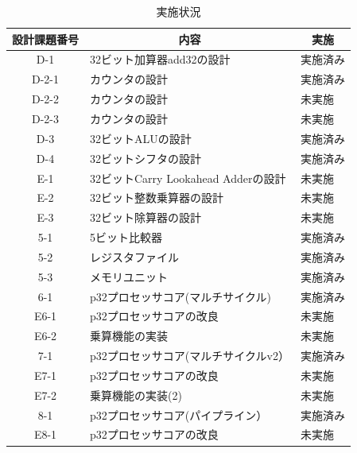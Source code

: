 \documentclass{jarticle}[11pt]
\begin{document}
\begin{table}[htb] %
\caption{実施状況}
\label{実施状況}
\begin{center}
\begin{tabular}{c|p{6cm}|p{4cm}}
\hline \hline
設計課題番号 & 
\multicolumn{1}{c}{内容} &
\multicolumn{1}{|c}{実施} 
\\ \hline

D-1 &
32ビット加算器add32の設計 &
実施済み 
\\

D-2-1 &
カウンタの設計 &
実施済み 
\\

D-2-2 &
カウンタの設計 &
未実施
\\

D-2-3 &
カウンタの設計 &
未実施
\\

D-3 &
32ビットALUの設計 &
実施済み
\\

D-4 &
32ビットシフタの設計 &
実施済み
\\

E-1 &
32ビットCarry Lookahead Adderの設計 &
未実施
\\

E-2 &
32ビット整数乗算器の設計 &
未実施
\\

E-3 &
32ビット除算器の設計 &
未実施
\\

5-1 &
5ビット比較器 &
実施済み
\\

5-2 &
レジスタファイル &
実施済み
\\

5-3 &
メモリユニット &
実施済み
\\

6-1 &
p32プロセッサコア(マルチサイクル) &
実施済み
\\

E6-1 &
p32プロセッサコアの改良 &
未実施
\\

E6-2 &
乗算機能の実装 &
未実施
\\

7-1 &
p32プロセッサコア(マルチサイクルv2） &
実施済み
\\

E7-1 &
p32プロセッサコアの改良 &
未実施
\\

E7-2 &
乗算機能の実装(2) &
未実施
\\

8-1 &
p32プロセッサコア(パイプライン） &
実施済み
\\

E8-1 &
p32プロセッサコアの改良 &
未実施
\\

\hline
\end{tabular}
\end{center}
\end{table}
\end{document}
